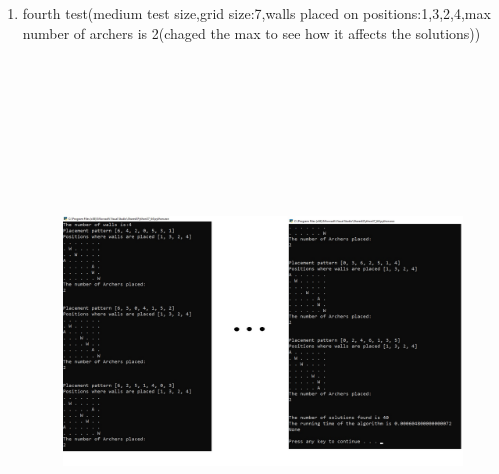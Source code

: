 \documentclass{article}
\begin{document}
\begin{enumerate}
\newpage
\item fourth test(medium test size,grid size:7,walls placed on positions:1,3,2,4,max number of archers is 2(chaged the max to see how it affects the solutions))
\begin{figure}[h]
\includegraphics[width=12 cm, height=15cm]{test4}
\end{figure}


\end{enumerate}
\end{document}
